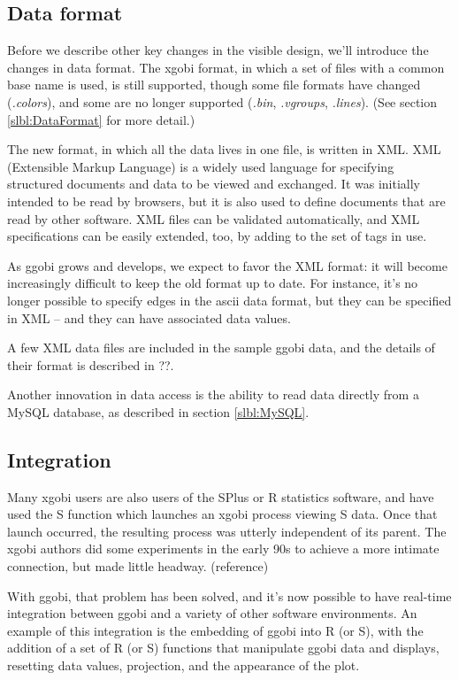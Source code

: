 \documentclass[11pt]{article}
\begin{document}
\subsection {Data format}

Before we describe other key changes in the visible design, we'll
introduce the changes in data format.  The xgobi format, in which a
set of files with a common base name is used, is still supported,
though some file formats have changed ({\em .colors}), and some are
no longer supported ({\em .bin}, {\em .vgroups}, {\em .lines}). 
(See section \ref{slbl:DataFormat} for more detail.)

The new format, in which all the data lives in one file, is written
in XML.  XML (Extensible Markup Language) is a widely used language
for specifying structured documents and data to be viewed and
exchanged.  It was initially intended to be read by browsers, but it
is also used to define documents that are read by other software.
XML files can be validated automatically, and XML specifications can
be easily extended, too, by adding to the set of tags in use.

As ggobi grows and develops, we expect to favor the XML format:  it
will become increasingly difficult to keep the old format up to
date.  For instance, it's no longer possible to specify edges
in the ascii data format, but they can be specified in XML -- and
they can have associated data values.

A few XML data files are included in the sample ggobi data, and
the details of their format is described in ??.

Another innovation in data access is the ability to read data
directly from a MySQL database, as described in section \ref{slbl:MySQL}.

\subsection{Integration}

Many xgobi users are also users of the SPlus or R statistics
software, and have used the S function which launches an xgobi
process viewing S data.  Once that launch occurred, the resulting
process was utterly independent of its parent.  The xgobi authors
did some experiments in the early 90s to achieve a more intimate
connection, but made little headway.  (reference)

With ggobi, that problem has been solved, and it's now possible
to have real-time integration between ggobi and a variety of
other software environments.  An example of this integration is
the embedding of ggobi into R (or S), with the addition of a set of
R (or S) functions that manipulate ggobi data and displays,
resetting data values, projection, and the appearance of the plot.
\end{document}
